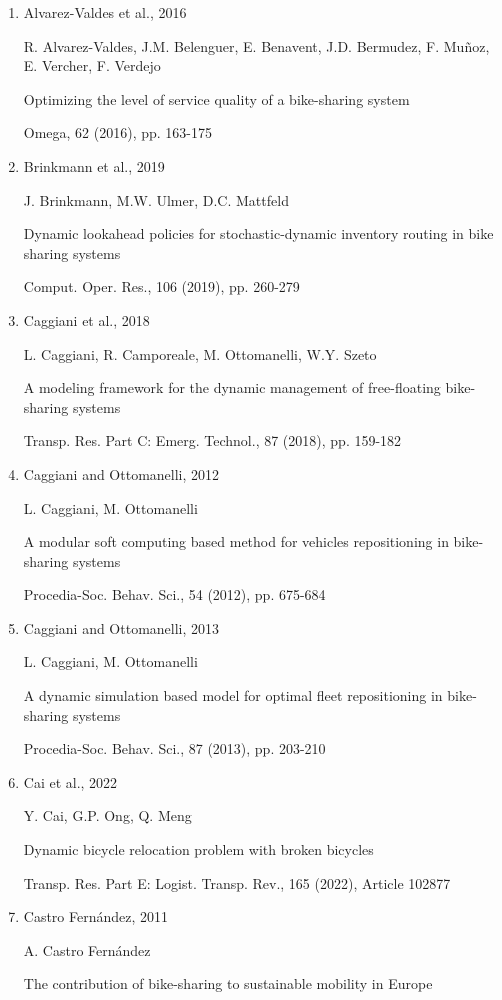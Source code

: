 \documentclass[
  english,
]{article}
\providecommand{\tightlist}{%
  \setlength{\itemsep}{0pt}\setlength{\parskip}{0pt}}
\providecommand{\tightlist}{%
  \setlength{\itemsep}{0pt}\setlength{\parskip}{0pt}}
\begin{document}
\begin{otherlanguage}{english}
\protect{}\label{bs005}
\begin{enumerate}
\tightlist
\item
  Alvarez-Valdes et al., 2016

  R. Alvarez-Valdes, J.M. Belenguer, E. Benavent, J.D. Bermudez, F. Muñoz, E. Vercher, F. Verdejo

  Optimizing the level of service quality of a bike-sharing system

  Omega, 62 (2016), pp. 163-175
\item
  Brinkmann et al., 2019

  J. Brinkmann, M.W. Ulmer, D.C. Mattfeld

  Dynamic lookahead policies for stochastic-dynamic inventory routing in bike sharing systems

  Comput. Oper. Res., 106 (2019), pp. 260-279
\item
  Caggiani et al., 2018

  L. Caggiani, R. Camporeale, M. Ottomanelli, W.Y. Szeto

  A modeling framework for the dynamic management of free-floating bike-sharing systems

  Transp. Res. Part C: Emerg. Technol., 87 (2018), pp. 159-182
\item
  Caggiani and Ottomanelli, 2012

  L. Caggiani, M. Ottomanelli

  A modular soft computing based method for vehicles repositioning in bike-sharing systems

  Procedia-Soc. Behav. Sci., 54 (2012), pp. 675-684
\item
  Caggiani and Ottomanelli, 2013

  L. Caggiani, M. Ottomanelli

  A dynamic simulation based model for optimal fleet repositioning in bike-sharing systems

  Procedia-Soc. Behav. Sci., 87 (2013), pp. 203-210
\item
  Cai et al., 2022

  Y. Cai, G.P. Ong, Q. Meng

  Dynamic bicycle relocation problem with broken bicycles

  Transp. Res. Part E: Logist. Transp. Rev., 165 (2022), Article 102877
\item
  Castro Fernández, 2011

  A. Castro Fernández

  The contribution of bike-sharing to sustainable mobility in Europe


\end{enumerate}
\end{otherlanguage}
\end{document}
